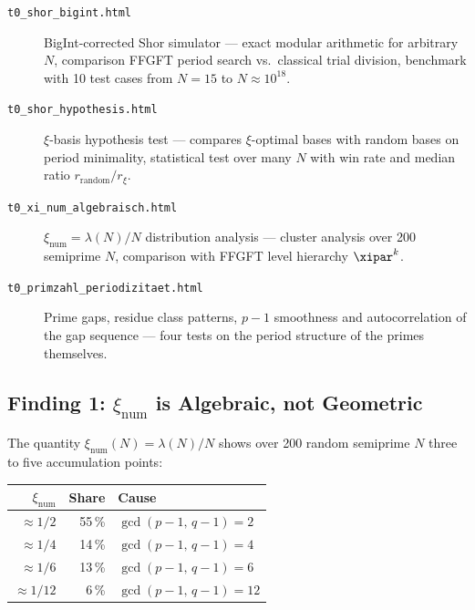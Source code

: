 \begin{description}
  \item[\texttt{t0\_shor\_bigint.html}]
    BigInt-corrected Shor simulator ---
    exact modular arithmetic for arbitrary $N$,
    comparison FFGFT period search vs.\ classical trial division,
    benchmark with 10 test cases from $N=15$ to $N \approx 10^{18}$.

  \item[\texttt{t0\_shor\_hypothesis.html}]
    $\xi$-basis hypothesis test ---
    compares $\xi$-optimal bases with random bases
    on period minimality, statistical test over many $N$
    with win rate and median ratio $r_\text{random}/r_\xi$.

  \item[\texttt{t0\_xi\_num\_algebraisch.html}]
    $\xi_\text{num} = \lambda(N)/N$ distribution analysis ---
    cluster analysis over 200 semiprime $N$,
    comparison with FFGFT level hierarchy $\xipar^k$.

  \item[\texttt{t0\_primzahl\_periodizitaet.html}]
    Prime gaps, residue class patterns, $p{-}1$ smoothness
    and autocorrelation of the gap sequence ---
    four tests on the period structure of the primes themselves.
\end{description}

\subsection{Finding 1: \texorpdfstring{$\xi_\text{num}$}{xi\_num} is Algebraic,
  not Geometric}

The quantity $\xi_\text{num}(N) = \lambda(N)/N$
shows over 200 random semiprime $N$
three to five accumulation points:

\begin{center}
{\footnotesize
\begin{tabular}{rrl}
\toprule
$\xi_\text{num}$ & Share & Cause \\
\midrule
$\approx 1/2$ & 55\,\% & $\gcd(p-1,\,q-1) = 2$ \\
$\approx 1/4$ & 14\,\% & $\gcd(p-1,\,q-1) = 4$ \\
$\approx 1/6$ & 13\,\% & $\gcd(p-1,\,q-1) = 6$ \\
$\approx 1/12$ & 6\,\% & $\gcd(p-1,\,q-1) = 12$ \\
\bottomrule
\end{tabular}
} %
\end{center}

